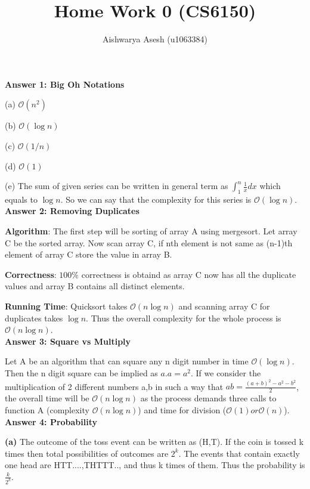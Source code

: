 \documentclass{article}
\begin{document}
\title{Home Work 0 (CS6150)}
\author{Aishwarya Asesh (u1063384)}
\maketitle
\raggedright

\textbf {Answer 1: Big Oh Notations}

(a) $\mathcal{O}(n^2)$

(b) $\mathcal{O}(\log n)$

(c) $\mathcal{O}(1/n)$

(d) $\mathcal{O}(1)$
 
(e) The sum of given series can be written in general term as $\int_{1}^{n} \frac{1}{x}dx$ which equals to $\log n$. So we can say that the complexity for this series is $\mathcal{O}(\log n)$.
\\[10pt]
\textbf {Answer 2: Removing Duplicates}

\textbf {Algorithm}: The first step will be sorting of array A using mergesort. Let array C be the sorted array. Now scan array C, if nth element is not same as (n-1)th element of array C store the value in array B.
  
\textbf {Correctness}: $100 \%$ correctness is obtaind as array C now has all the duplicate values and array B contains all distinct elements.

\textbf {Running Time}: Quicksort takes $\mathcal{O}(n\log n)$ and scanning array C for duplicates takes $\log n$. Thus the overall complexity for the whole process is $\mathcal{O}(n\log n)$.
\\[10pt]
\textbf {Answer 3: Square vs Multiply}

Let A be an algorithm that can square any n digit number in time $\mathcal{O}(\log n)$. Then the n digit square can be implied as $a.a=a^2$.
If we consider the multiplication of 2 different numbers a,b in such a way that $ab=\frac {(a+b)^2 -a^2 - b^2} {2}$, the overall time will be $\mathcal{O}{(n \log n)}$ as the process demands three calls to function A (complexity $\mathcal{O}{(n \log n)}$) and time for division ($\mathcal{O}(1) or \mathcal {O}(n)$).
\\[10pt]
\textbf {Answer 4: Probability}

\textbf {(a)}
The outcome of the toss event can be written as (H,T). If the coin is tossed k times then total possibilities of outcomes are $2^k$. The events that contain exactly one head are HTT....,THTTT.., and thus k times of them. Thus the probability is $\frac{k} {2^k}$.
\end{document}
